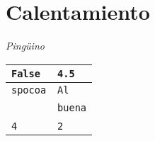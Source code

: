 \section{Calentamiento}

\textit{Pingüino}

\begin{table}[htbp]
    \centering
    \begin{tabular}{|l|l|}
    \hline
    \texttt{False} & \texttt{4.5} \\ \hline
    \texttt{spocoa} & \texttt{Al} \\
    \  & \texttt{buena} \\ \hline
    \texttt{4} & \texttt{2} \\ \hline
    \end{tabular}
\end{table}
